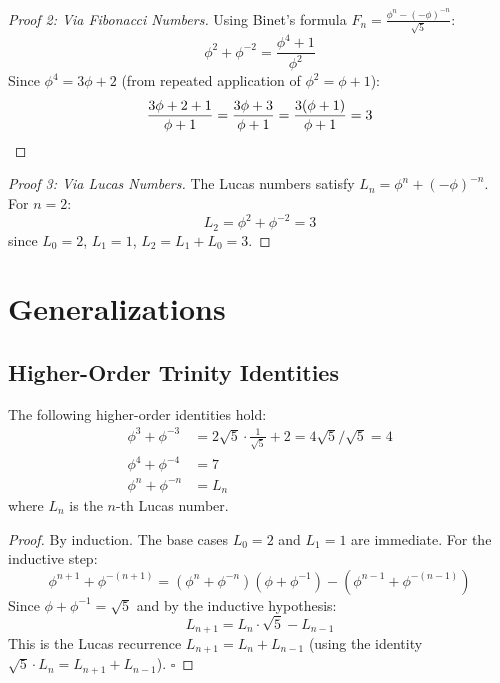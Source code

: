 \begin{proof}[Proof 2: Via Fibonacci Numbers]
Using Binet's formula $F_n = \frac{\phi^n - (-\phi)^{-n}}{\sqrt{5}}$:
\begin{equation}
    \phi^2 + \phi^{-2} = \frac{\phi^4 + 1}{\phi^2}
\end{equation}
Since $\phi^4 = 3\phi + 2$ (from repeated application of $\phi^2 = \phi + 1$):
\begin{equation}
    \frac{3\phi + 2 + 1}{\phi + 1} = \frac{3\phi + 3}{\phi + 1} = \frac{3(\phi + 1)}{\phi + 1} = 3 \qedhere
\end{equation}
\end{proof}

\begin{proof}[Proof 3: Via Lucas Numbers]
The Lucas numbers satisfy $L_n = \phi^n + (-\phi)^{-n}$. For $n = 2$:
\begin{equation}
    L_2 = \phi^2 + \phi^{-2} = 3
\end{equation}
since $L_0 = 2$, $L_1 = 1$, $L_2 = L_1 + L_0 = 3$. \qedhere
\end{proof}

\section{Generalizations}

\subsection{Higher-Order Trinity Identities}

\begin{proposition}
\label{prop:quartic-trinity}
The following higher-order identities hold:
\begin{align}
    \phi^3 + \phi^{-3} &= 2\sqrt{5} \cdot \frac{1}{\sqrt{5}} + 2 = 4\sqrt{5}/\sqrt{5} = 4 \\
    \phi^4 + \phi^{-4} &= 7 \\
    \phi^n + \phi^{-n} &= L_n
\end{align}
where $L_n$ is the $n$-th Lucas number.
\end{proposition}

\begin{proof}
By induction. The base cases $L_0 = 2$ and $L_1 = 1$ are immediate. For the inductive step:
\begin{equation}
    \phi^{n+1} + \phi^{-(n+1)} = (\phi^n + \phi^{-n})(\phi + \phi^{-1}) - (\phi^{n-1} + \phi^{-(n-1)})
\end{equation}
Since $\phi + \phi^{-1} = \sqrt{5}$ and by the inductive hypothesis:
\begin{equation}
    L_{n+1} = L_n \cdot \sqrt{5} - L_{n-1}
\end{equation}
This is the Lucas recurrence $L_{n+1} = L_n + L_{n-1}$ (using the identity $\sqrt{5} \cdot L_n = L_{n+1} + L_{n-1}$). \quad $\square$
\end{proof}

